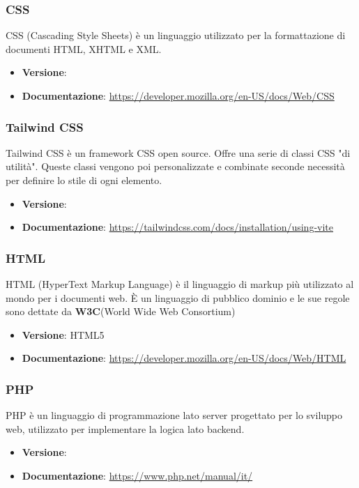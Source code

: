 \documentclass[a4paper,10pt]{article}
\begin{document}
\subsubsection{CSS}
CSS (Cascading Style Sheets) è un linguaggio utilizzato per la formattazione di documenti HTML, XHTML e XML.
\begin{itemize}
    \item \textbf{Versione}:
    \item \textbf{Documentazione}: \url{https://developer.mozilla.org/en-US/docs/Web/CSS}
\end{itemize}

\subsubsection{Tailwind CSS}
Tailwind CSS è un framework CSS open source. Offre una serie  di classi CSS "di utilità". Queste classi vengono poi personalizzate e combinate seconde necessità per definire lo stile di ogni elemento.
\begin{itemize}
    \item \textbf{Versione}:
    \item \textbf{Documentazione}: \url{https://tailwindcss.com/docs/installation/using-vite}
\end{itemize}

\subsubsection{HTML}
HTML (HyperText Markup Language) è il linguaggio di markup più utilizzato al mondo per i documenti web. È un linguaggio di pubblico dominio e le sue regole sono dettate da \textbf{W3C}(World Wide Web Consortium)
\begin{itemize}
    \item \textbf{Versione}: HTML5
    \item \textbf{Documentazione}: \url{https://developer.mozilla.org/en-US/docs/Web/HTML}
\end{itemize}

\subsubsection{PHP}
PHP è un linguaggio di programmazione lato server progettato per lo sviluppo web, utilizzato per implementare la logica lato backend.
\begin{itemize}
    \item \textbf{Versione}:
    \item \textbf{Documentazione}: \url{https://www.php.net/manual/it/}
\end{itemize}
\end{document}
